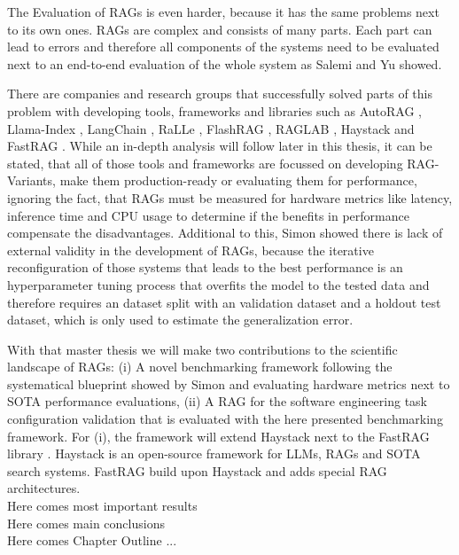 The Evaluation of RAGs is even harder, because it has the same problems next to its own ones. RAGs are complex and consists of many parts. Each part can lead to errors and therefore all components of the systems need to be evaluated next to an end-to-end evaluation of the whole system as Salemi \cite{Salemi.2024} and Yu \cite{Yu.2024} showed.

There are companies and research groups that successfully solved parts of this problem with developing tools, frameworks and libraries such as AutoRAG \cite{AutoRAG}, Llama-Index \cite{Liu_LlamaIndex_2022}, LangChain \cite{Chase_LangChain_2022}, RaLLe \cite{ralle}, FlashRAG \cite{FlashRAG}, RAGLAB \cite{zhang-etal-2024-raglab}, Haystack \cite{Pietsch_Haystack_the_end-to-end_2019} and FastRAG \cite{Izsak_fastRAG_Efficient_Retrieval_2023}. While an in-depth analysis will follow later in this thesis, it can be stated, that all of those tools and frameworks are focussed on developing RAG-Variants, make them production-ready or evaluating them for performance, ignoring the fact, that RAGs must be measured for hardware metrics like latency, inference time and CPU usage to determine if the benefits in performance compensate the disadvantages. Additional to this, Simon \cite{Simon.10112024} showed there is lack of external validity in the development of RAGs, because the iterative reconfiguration of those systems that leads to the best performance is an hyperparameter tuning process that overfits the model to the tested data and therefore requires an dataset split with an validation dataset and a holdout test dataset, which is only used to estimate the generalization error.

With that master thesis we will make two contributions to the scientific landscape of RAGs: (i) A novel benchmarking framework following the systematical blueprint showed by Simon \cite{Simon.10112024} and evaluating hardware metrics next to SOTA performance evaluations, (ii) A RAG for the software engineering task configuration validation that is evaluated with the here presented benchmarking framework. For (i), the framework will extend Haystack \cite{Pietsch_Haystack_the_end-to-end_2019} next to the FastRAG library \cite{Izsak_fastRAG_Efficient_Retrieval_2023}. Haystack is an open-source framework for LLMs, RAGs and SOTA search systems. FastRAG build upon Haystack and adds special RAG architectures. \\


\large Here comes most important results \\
\large Here comes main conclusions \\
\large Here comes Chapter Outline ...\\
